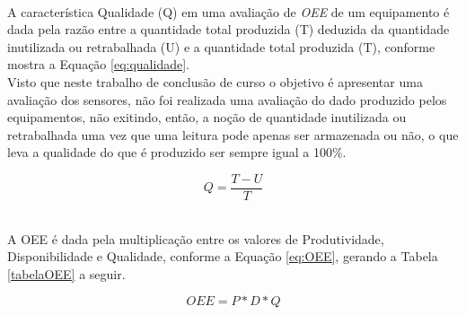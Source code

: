 \\\null \quad A característica Qualidade (Q) em uma avaliação de \textit{\acrlong{OEE}} de um equipamento é dada pela razão entre a quantidade total produzida (T) deduzida da quantidade inutilizada ou retrabalhada (U) e a quantidade total produzida (T), conforme mostra a Equação \ref{eq:qualidade}.
\\ \null \quad Visto que neste trabalho de conclusão de curso o objetivo é apresentar uma avaliação dos sensores, não foi realizada uma avaliação do dado produzido pelos equipamentos, não exitindo, então, a noção de quantidade inutilizada ou retrabalhada uma vez que uma leitura pode apenas ser armazenada ou não, o que leva a qualidade do que é produzido ser sempre igual a 100\%.

\begin{equation}
  Q = \frac{T-U}{T}
  \label{eq:qualidade}
\end{equation}


\\\null \quad A \acrshort{OEE} é dada pela multiplicação entre os valores de Produtividade, Disponibilidade e Qualidade, conforme a Equação \ref{eq:OEE}, gerando a Tabela \ref{tabelaOEE} a seguir.

\begin{equation}
  OEE = P * D * Q
  \label{eq:OEE}
\end{equation}

